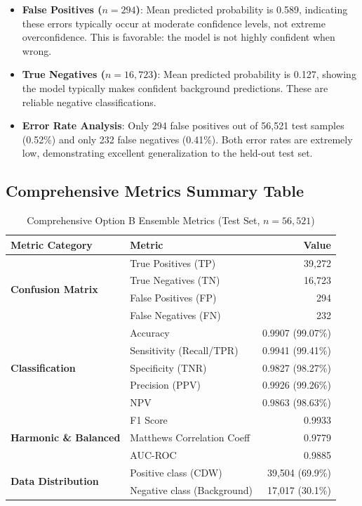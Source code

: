 \begin{itemize}
    \item \textbf{False Positives ($n=294$)}: Mean predicted probability is 0.589, indicating these
          errors typically occur at moderate confidence levels, not extreme overconfidence. This is
          favorable: the model is not highly confident when wrong.

    \item \textbf{True Negatives ($n=16,723$)}: Mean predicted probability is 0.127, showing the
          model typically makes confident background predictions. These are reliable negative
          classifications.

    \item \textbf{Error Rate Analysis}: Only 294 false positives out of 56,521 test samples (0.52\%)
          and only 232 false negatives (0.41\%). Both error rates are extremely low, demonstrating
          excellent generalization to the held-out test set.
\end{itemize}

\subsection{Comprehensive Metrics Summary Table}

\begin{table}[H]
\centering
\caption{Comprehensive Option B Ensemble Metrics (Test Set, $n=56,521$)}
\label{tab:comprehensive_metrics}
\begin{tabular}{llr}
\hline
\textbf{Metric Category} & \textbf{Metric} & \textbf{Value} \\
\hline
\multirow{4}{*}{\textbf{Confusion Matrix}} & True Positives (TP) & 39,272 \\
& True Negatives (TN) & 16,723 \\
& False Positives (FP) & 294 \\
& False Negatives (FN) & 232 \\
\hline
\multirow{5}{*}{\textbf{Classification}} & Accuracy & 0.9907 (99.07\%) \\
& Sensitivity (Recall/TPR) & 0.9941 (99.41\%) \\
& Specificity (TNR) & 0.9827 (98.27\%) \\
& Precision (PPV) & 0.9926 (99.26\%) \\
& NPV & 0.9863 (98.63\%) \\
\hline
\multirow{3}{*}{\textbf{Harmonic \& Balanced}} & F1 Score & 0.9933 \\
& Matthews Correlation Coeff & 0.9779 \\
& AUC-ROC & 0.9885 \\
\hline
\multirow{2}{*}{\textbf{Data Distribution}} & Positive class (CDW) & 39,504 (69.9\%) \\
& Negative class (Background) & 17,017 (30.1\%) \\
\hline
\end{tabular}
\end{table}

